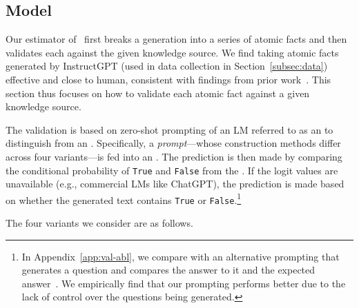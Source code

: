 
\subsection{Model}\label{subsec:models-validation}

Our estimator of \ours\ first breaks a generation into a series of atomic facts and then validates each against the given knowledge source. 
We find taking atomic facts generated by InstructGPT (used in data collection in Section~\ref{subsec:data}) effective and close to human, consistent with findings from prior work~\citep{chen2022generating}.
This section thus focuses on how to validate each atomic fact against a given knowledge source.

The validation is based on zero-shot prompting of an LM referred to as an \textbf{\evalLM} to distinguish from an \subjectLM.
Specifically, a {\em prompt}---whose construction methods differ across four variants---is fed into an \evalLM.
The prediction is then made by comparing the conditional probability of \texttt{True} and \texttt{False} from the \evalLM.
If the logit values are unavailable (e.g., commercial LMs like ChatGPT), the prediction is made based on whether the generated text contains \texttt{True} or \texttt{False}.\footnote{
    In Appendix~\ref{app:val-abl}, we compare with an alternative prompting that generates a question and compares the answer to it and the expected answer~\citep{kryscinski2019evaluating,wang2020asking,gao2022attributed,manakul2023selfcheckgpt}.
    We empirically find that our prompting performs better due to the lack of control over the questions being generated.
}

\noindent 
The four variants we consider are as follows.

